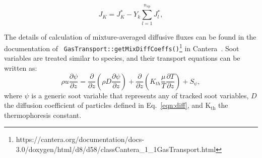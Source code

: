 \begin{equation}
	J_K = J^*_K - Y_k \sum_{l=1}^{n_{sp}} J^*_l
	\label{eqn:diffflux},
\end{equation}

The details of calculation of mixture-averaged diffusive fluxes can be found in the documentation of \verb| GasTransport::getMixDiffCoeffs()|\footnote[1]{https://cantera.org/documentation/docs-3.0/doxygen/html/d8/d58/classCantera\_1\_1GasTransport.html} in Cantera~\citep{cantera}. Soot variables are treated similar to species, and their transport equations can be written as:
\begin{equation}
	\rho u\frac{\partial \psi}{\partial z} = 
	\frac{\partial}{\partial z}
	\left(
		\rho
		D\frac{\partial \psi}{\partial z}
	\right)
	+
	\frac{\partial}{\partial z}
	\left(
		K_{th}
		\frac{\mu}{T}
		\frac{\partial T}{\partial z}
	\right)
	+ S_{\psi} 
	\label{eqn:flame_soot},
\end{equation}
\noindent where $\psi$ is a generic soot variable that represents any of tracked soot variables, $D$ the diffusion coefficient of particles defined in Eq.~\eqref{eqn:diff}, and $\mathrm{K_{th}}$ the thermophoresis constant.